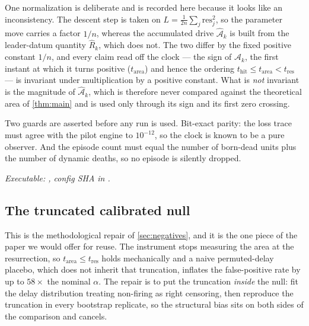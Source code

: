 \documentclass[11pt]{article}
\theoremstyle{definition}
\theoremstyle{remark}
\newcommand{\thit}{t_{\mathrm{hit}}}
\newcommand{\Ar}{\mathcal{A}}                      %
\begin{document}
\noindent One normalization is deliberate and is recorded here because it looks
like an inconsistency. The descent step is taken on
$L=\tfrac1{2n}\sum_j\mathrm{res}_j^2$, so the parameter move carries a factor
$1/n$, whereas the accumulated drive $\hat{\Ar}_k$ is built from the
leader-datum quantity $\hat R_k$, which does not. The two differ by the fixed
positive constant $1/n$, and every claim read off the clock --- the sign of
$\hat{\Ar}_k$, the first instant at which it turns positive ($t_{\mathrm{area}}$)
and hence the ordering $\thit\le t_{\mathrm{area}}<t_{\mathrm{res}}$ --- is
invariant under multiplication by a positive constant. What is \emph{not}
invariant is the magnitude of $\hat{\Ar}_k$, which is therefore never compared
against the theoretical area of \cref{thm:main} and is used only through its
sign and its first zero crossing.

\noindent Two guards are asserted before any run is used. Bit-exact parity: the
loss trace must agree with the pilot engine to $10^{-12}$, so the clock is known
to be a pure observer. And the episode count must equal the number of born-dead
units plus the number of dynamic deaths, so no episode is silently dropped.

\noindent\textit{Executable: ,
config SHA in .}

\subsection{The truncated calibrated null}\label{app:alg2}

This is the methodological repair of \cref{sec:negatives}, and it is the one
piece of the paper we would offer for reuse. The instrument stops measuring the
area at the resurrection, so $t_{\mathrm{area}}\le t_{\mathrm{res}}$ holds
mechanically and a naive permuted-delay placebo, which does not inherit that
truncation, inflates the false-positive rate by up to $58\times$ the nominal
$\alpha$. The repair is to put the truncation \emph{inside} the null: fit the
delay distribution treating non-firing as right censoring, then reproduce the
truncation in every bootstrap replicate, so the structural bias sits on both
sides of the comparison and cancels.
\end{document}
